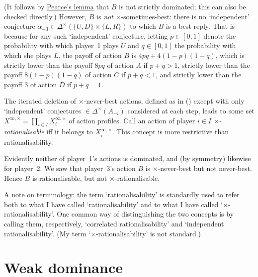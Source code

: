 \begin{example}
	(It follows by \hyperref[lemma:pearce]{Pearce's lemma} that $B$ is not strictly dominated; this can also be checked directly.)
	However, $B$ is \emph{not} $\times$-sometimes-best: there is no `independent' conjecture $\alpha_{-3} \in \Delta^\times (\{U,D\} \times \{L,R\})$ to which $B$ is a best reply. That is because for any such `independent' conjecture, letting $p \in [0,1]$ denote the probability with which player~1 plays $U$ and $q \in [0,1]$ the probability with which she plays $L$,
	the payoff of action $B$ is $4pq + 4(1-p)(1-q)$, which is
	strictly lower than the payoff $8pq$ of action $A$ if $p+q>1$,
	strictly lower than the payoff $8(1-p)(1-q)$ of action $C$ if $p+q<1$,
	and strictly lower than the payoff $3$ of action $D$ if $p+q=1$.
\end{example}

The iterated deletion of $\times$-never-best actions, defined as in  () except with only `independent' conjectures $\in \Delta^\times(A_{-i})$ considered at each step, leads to some set $X^{\infty,\times} = \prod_{i \in I} X^{\infty,\times}_i$ of action profiles. Call an action of player $i \in I$ \emph{$\times$-rationalisable} iff it belongs to $X^{\infty,\times}_i$. This concept is more restrictive than rationalisability.

\addtocounter{example}{-1}
\begin{example}[continued]
	\label{example:rbty_indep_contd}
	Evidently neither of player~1's actions is dominated, and (by symmetry) likewise for player~2. We saw that player~3's action $B$ is $\times$-never-best but not never-best. Hence $B$ is rationalisable, but not $\times$-rationalisable.
\end{example}

A note on terminology: the term `rationalisability' is standardly used to refer both to what I have called `rationalisability' and to what I have called `$\times$-rationalisability'. One common way of distinguishing the two concepts is by calling them, respectively, `correlated rationalisability' and `independent rationalisability'. (My term `$\times$-rationalisability' is not standard.)



\section{Weak dominance}
\label{dom:weak_dom}

